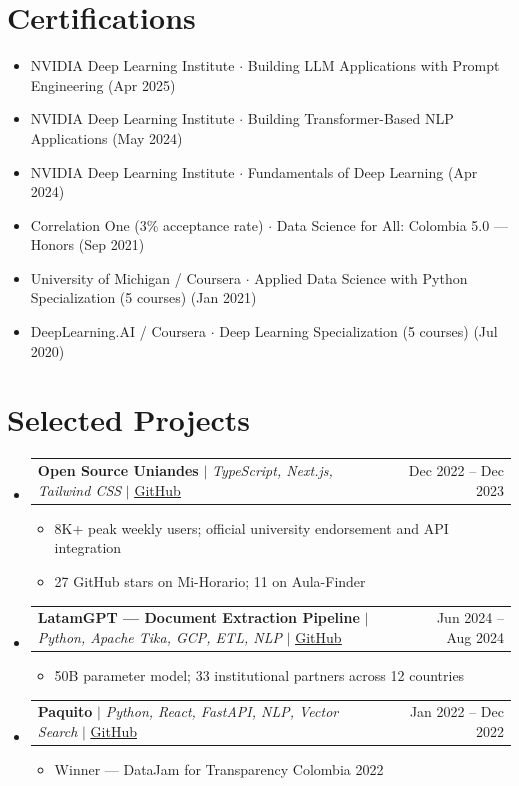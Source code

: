 \documentclass[letterpaper,11pt]{article}
\makeatletter
\newcommand{\cvItem}[1]{
  \item\small{#1 \vspace{-2pt}}
}
\newcommand{\cvProjectHeading}[2]{
  \item
    \begin{tabular*}{0.97\textwidth}{l@{\extracolsep{\fill}}r}
      \small#1 & \small #2 \\
    \end{tabular*}\vspace{-7pt}
}
\newcommand{\cvListStart}{\begin{itemize}[leftmargin=0.15in, label={}]}
\newcommand{\cvListEnd}{\end{itemize}}
\newcommand{\cvItemListStart}{\begin{itemize}[itemsep=-2pt]}
\newcommand{\cvItemListEnd}{\end{itemize}\vspace{-5pt}}
\makeatother
\begin{document}
\section{Certifications}
\begin{itemize}[leftmargin=0.15in, label={}, itemsep=-2pt]
  \item \small NVIDIA Deep Learning Institute $\cdot$ Building LLM Applications with Prompt Engineering (Apr 2025)
  \item \small NVIDIA Deep Learning Institute $\cdot$ Building Transformer-Based NLP Applications (May 2024)
  \item \small NVIDIA Deep Learning Institute $\cdot$ Fundamentals of Deep Learning (Apr 2024)
  \item \small Correlation One (3\% acceptance rate) $\cdot$ Data Science for All: Colombia 5.0 — Honors (Sep 2021)
  \item \small University of Michigan / Coursera $\cdot$ Applied Data Science with Python Specialization (5 courses) (Jan 2021)
  \item \small DeepLearning.AI / Coursera $\cdot$ Deep Learning Specialization (5 courses) (Jul 2020)
\end{itemize}

\section{Selected Projects}
\cvListStart
  \cvProjectHeading
    {\textbf{Open Source Uniandes} $|$ \emph{TypeScript, Next.js, Tailwind CSS} $|$ \href{https://github.com/Open-Source-Uniandes}{\underline{GitHub}}}
    {Dec 2022 -- Dec 2023}
    \cvItemListStart
      \cvItem{8K+ peak weekly users; official university endorsement and API integration}
      \cvItem{27 GitHub stars on Mi-Horario; 11 on Aula-Finder}
    \cvItemListEnd
  \cvProjectHeading
    {\textbf{LatamGPT — Document Extraction Pipeline} $|$ \emph{Python, Apache Tika, GCP, ETL, NLP} $|$ \href{https://github.com/jsurrea/LLM-Latino}{\underline{GitHub}}}
    {Jun 2024 -- Aug 2024}
    \cvItemListStart
      \cvItem{50B parameter model; 33 institutional partners across 12 countries}
    \cvItemListEnd
  \cvProjectHeading
    {\textbf{Paquito} $|$ \emph{Python, React, FastAPI, NLP, Vector Search} $|$ \href{https://github.com/jsurrea/Paquito}{\underline{GitHub}}}
    {Jan 2022 -- Dec 2022}
    \cvItemListStart
      \cvItem{Winner — DataJam for Transparency Colombia 2022}
    \cvItemListEnd
\cvListEnd

\end{document}
